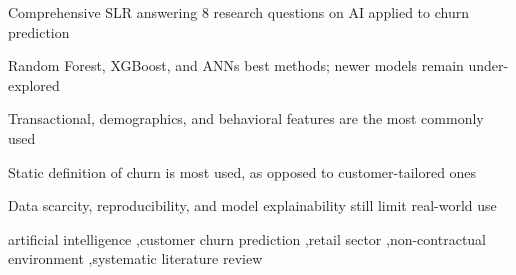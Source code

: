 \documentclass[a4paper,fleqn]{cas-sc}
\begin{document}
\begin{abstract}
    \ExplSyntaxOn
    
  \ExplSyntaxOff
\end{abstract}


\begin{highlights}
\item Comprehensive SLR answering 8 research questions on AI applied to churn prediction
\item Random Forest, XGBoost, and ANNs best methods; newer models remain under-explored
\item Transactional, demographics, and behavioral features are the most commonly used
\item Static definition of churn is most used, as opposed to customer-tailored ones
\item Data scarcity, reproducibility, and model explainability still limit real-world use 
\end{highlights}

\begin{keywords}
artificial intelligence \sep customer churn prediction \sep retail sector \sep non-contractual environment \sep systematic literature review 
\end{keywords}


\maketitle








\printcredits

% 



\appendix

\end{document}
